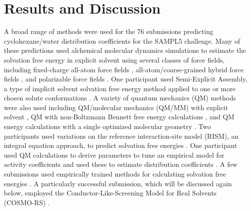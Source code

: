 \section{Results and Discussion}
\label{results:1}
A broad range of methods were used for the 76 submissions predicting cyclohexane/water distribution coefficients for the SAMPL5 challenge. 
Many of these predictions used alchemical molecular dynamics simulations to estimate the solvation free energy in explicit solvent using several classes of force fields, including fixed-charge all-atom force fields \cite{Paranahewage:sampl5,Iorga:sampl5,Bosisio:sampl5,Pickard:sampl5,Konig:sampl5},
all-atom/coarse-grained hybrid force fields \cite{Genheden:sampl5}, 
and polarizable force fields \cite{Kamath:sampl5}. 
One participant used Semi-Explicit Assembly, a type of implicit solvent solvation free energy method applied to one or more chosen solute conformations \cite{Brini:sampl5}. 
A variety of quantum mechanics (QM) methods were also used including QM/molecular mechanics (QM/MM) with explicit solvent \cite{Pickard:sampl5,Konig:sampl5}, 
QM with non-Boltzmann Bennett free energy calculations \cite{Pickard:sampl5,Konig:sampl5}, 
and QM energy calculations with a single optimized molecular geometry \cite{Pickard:sampl5,Jones:sampl5}. 
Two participants used variations on the reference interaction-site model (RISM), an integral equation approach, to predict solvation free energies \cite{Tielker:sampl5,Luchko:sampl5}. 
One participant used QM calculations to derive parameters to tune an empirical model for activity coefficients and used these to estimate distribution coefficients \cite{Paluch:sampl5}.
A few submissions used empirically trained methods for calculating solvation free energies \cite{Park:sampl5,Santos-Martins:sampl5}. 
A particularly successful submission, which will be discussed again below, employed the Conductor-Like-Screening Model for Real Solvents (COSMO-RS)  \cite{Klamt:sampl5}. 


